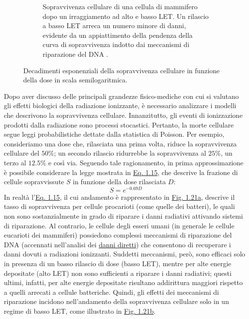 \documentclass[12pt,a4paper,twoside]{report}
\begin{document}
\begin{figure}[H]
\begin{subfigure}[t]{0.49\textwidth}
			\caption{Sopravvivenza cellulare di una cellula di mammifero dopo un irraggiamento ad alto e basso LET. Un rilascio a basso LET arreca un numero minore di danni, evidente da un appiattimento della pendenza della curva di sopravvivenza indotto dai meccanismi di riparazione del DNA \cite{radionuclides1}.}
			\label{fig:survival2}
		\end{subfigure}
		\caption{Decadimenti esponenziali della sopravvivenza cellulare in funzione della dose in scala semilogaritmica.}
	\end{figure}
	Dopo aver discusso delle principali grandezze fisico-mediche con cui si valutano gli effetti biologici della radiazione ionizzante, è necessario analizzare i modelli che descrivono la sopravvivenza cellulare. Innanzitutto, gli eventi di ionizzazione prodotti dalla radiazione sono processi stocastici. Pertanto, la morte cellulare segue leggi probabilistiche dettate dalla statistica di Poisson. Per esempio, consideriamo una dose che, rilasciata una prima volta, riduce la sopravvivenza cellulare del $50\%$; un secondo rilascio ridurrebbe la sopravvivenza al $25\%$, un terzo al $12.5\%$ e così via. Seguendo tale ragionamento, in prima approssimazione è possibile considerare la legge mostrata in \hyperref[eq:survival1]{Eq. 1.15}, che descrive la frazione di cellule sopravvissute $S$ in funzione della dose rilasciata $D$:
	\begin{equation}
		S=e^{-0.69D}
		\label{eq:survival1}
	\end{equation}
	In realtà l'\hyperref[eq:survival1]{Eq. 1.15}, il cui andamento è rappresentato in \hyperref[fig:survival1]{Fig. 1.21a}, descrive il tasso di sopravvivenza per cellule procarioti (come quelle dei batteri), le quali non sono sostanzialmente in grado di riparare i danni radiativi attivando sistemi di riparazione. Al contrario, le cellule degli esseri umani (in generale le cellule eucarioti dei mammiferi) possiedono complessi meccanismi di riparazione del DNA (accennati nell'analisi dei \hyperref[par:danno_diretto]{danni diretti}) che consentono di recuperare i danni dovuti a radiazioni ionizzanti. Suddetti meccanismi, però, sono efficaci solo in presenza di un basso rilascio di dose (basso LET), mentre per alte energie depositate (alto LET) non sono sufficienti a riparare i danni radiativi; questi ultimi, infatti, per alte energie depositate risultano addirittura maggiori rispetto a quelli arrecati a cellule batteriche. Quindi, gli effetti dei meccanismi di riparazione incidono nell'andamento della sopravvivenza cellulare solo in un regime di basso LET, come illustrato in \hyperref[fig:survival2]{Fig. 1.21b}.
	
\end{document}
